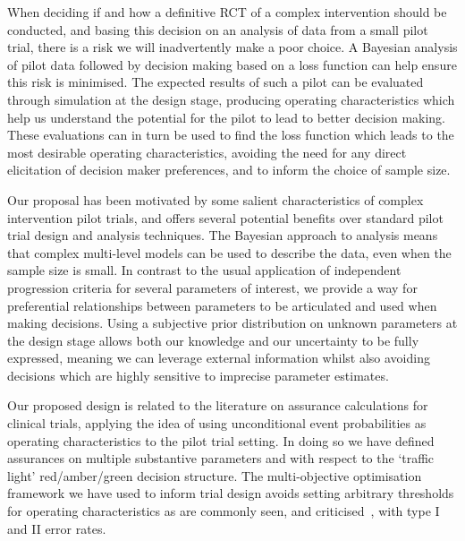 \documentclass{article} %
\begin{document}
When deciding if and how a definitive RCT of a complex intervention should be conducted, and basing this decision on an analysis of data from a small pilot trial, there is a risk we will inadvertently make a poor choice. A Bayesian analysis of pilot data followed by decision making based on a loss function can help ensure this risk is minimised. The expected results of such a pilot can be evaluated through simulation at the design stage, producing operating characteristics which help us understand the potential for the pilot to lead to better decision making. These evaluations can in turn be used to find the loss function which leads to the most desirable operating characteristics, avoiding the need for any direct elicitation of decision maker preferences, and to inform the choice of sample size.

Our proposal has been motivated by some salient characteristics of complex intervention pilot trials, and offers several potential benefits over standard pilot trial design and analysis techniques. The Bayesian approach to analysis means that complex multi-level models can be used to describe the data, even when the sample size is small. In contrast to the usual application of independent progression criteria for several parameters of interest, we provide a way for preferential relationships between parameters to be articulated and used when making decisions. Using a subjective prior distribution on unknown parameters at the design stage allows both our knowledge and our uncertainty to be fully expressed, meaning we can leverage external  information whilst also avoiding decisions which are highly sensitive to imprecise parameter estimates.

Our proposed design is related to the literature on assurance calculations for clinical trials, applying the idea of using unconditional event probabilities as operating characteristics to the pilot trial setting. In doing so we have defined assurances on multiple substantive parameters and with respect to the `traffic light' red/amber/green decision structure. The multi-objective optimisation framework we have used to inform trial design avoids setting arbitrary thresholds for operating characteristics as are commonly seen, and criticised~\cite{Bacchetti2010}, with type I and II error rates.
\end{document}
